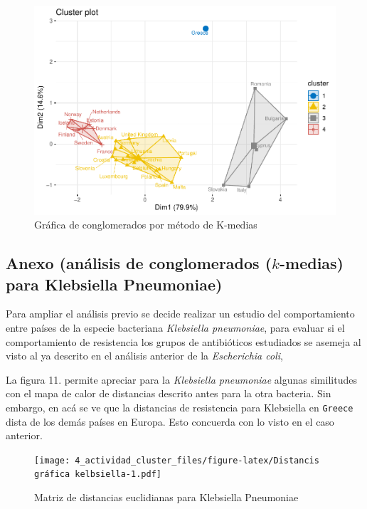 \documentclass[
]{article}
\begin{document}
\begin{figure}
\centering
\includegraphics{4_actividad_cluster_files/figure-latex/conglomerados K medias para ecoli-1.pdf}
\caption{Gráfica de conglomerados por método de K-medias}
\end{figure}

\hypertarget{anexo-anuxe1lisis-de-conglomerados-k-medias-para-klebsiella-pneumoniae}{%
\subsection{\texorpdfstring{Anexo (análisis de conglomerados
(\(k\)-medias) para Klebsiella
Pneumoniae)}{Anexo (análisis de conglomerados (k-medias) para Klebsiella Pneumoniae)}}\label{anexo-anuxe1lisis-de-conglomerados-k-medias-para-klebsiella-pneumoniae}}

Para ampliar el análisis previo se decide realizar un estudio del
comportamiento entre países de la especie bacteriana \emph{Klebsiella
pneumoniae}, para evaluar si el comportamiento de resistencia los grupos
de antibióticos estudiados se asemeja al visto al ya descrito en el
análisis anterior de la \emph{Escherichia coli},

La figura 11. permite apreciar para la \emph{Klebsiella pneumoniae}
algunas similitudes con el mapa de calor de distancias descrito antes
para la otra bacteria. Sin embargo, en acá se ve que la distancias de
resistencia para Klebsiella en \texttt{Greece} dista de los demás países
en Europa. Esto concuerda con lo visto en el caso anterior.

\begin{figure}
\centering
\texttt{[image: 4\_actividad\_cluster\_files/figure-latex/Distancis gráfica kelbsiella-1.pdf]}
\caption{Matriz de distancias euclidianas para Klebsiella Pneumoniae}
\end{figure}
\end{document}
